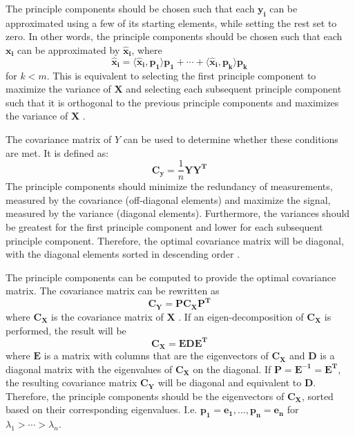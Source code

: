\documentclass[conference]{IEEEtran}
\begin{document}
    	The principle components should be chosen such that each $\mathbf{y_i}$ can be approximated using a few of its starting elements, while setting the rest set to zero. In other words, the principle components should be chosen such that each $\mathbf{x_i}$ can be approximated by $\mathbf{\hat{x}_i}$, where 
    	\begin{equation}
 		\mathbf{\hat{x}_i} = \langle \mathbf{\hat{x}_i}, \mathbf{p_1} \rangle \mathbf{p_1} + \cdots + \langle \mathbf{\hat{x}_i}, \mathbf{p_k} \rangle \mathbf{p_k}
 	\end{equation}   	
    	for $k < m$. This is equivalent to selecting the first principle component to maximize the variance of $\mathbf{X}$ and selecting each subsequent principle component such that it is orthogonal to the previous principle components and maximizes the variance of $\mathbf{X}$ \cite{shlens_2014_tutorial}.
    	
    	The covariance matrix of $Y$ can be used to determine whether these conditions are met. It is defined as:
	\begin{equation}
		\mathbf{C_y} = \frac{1}{n}{\mathbf{YY^T}}
	\end{equation} 
	The principle components should minimize the redundancy of measurements, measured by the covariance (off-diagonal elements) and maximize the signal, measured by the variance (diagonal elements). Furthermore, the variances should be greatest for the first principle component and lower for each subsequent principle component. Therefore, the optimal covariance matrix will be diagonal, with the diagonal elements sorted in descending order \cite{shlens_2014_tutorial}.
	
	The principle components can be computed to provide the optimal covariance matrix. The covariance matrix can be rewritten as
	\begin{equation}
		\mathbf{\mathbf{C_Y}} = {\mathbf{PC_XP^T}}
	\end{equation}
	where $\mathbf{C_X}$ is the covariance matrix of $\mathbf{X}$ \cite{shlens_2014_tutorial}. If an eigen-decomposition of $\mathbf{C_X}$ is performed, the result will be
	\begin{equation}
		\mathbf{C_X} = \mathbf{EDE^T}
	\end{equation}
	where $\mathbf{E}$ is a matrix with columns that are the eigenvectors of $\mathbf{C_X}$ and $\mathbf{D}$ is a diagonal matrix with the eigenvalues of $\mathbf{C_X}$ on the diagonal. If $\mathbf{P} = \mathbf{E^{-1}} = \mathbf{E^T}$, the resulting covariance matrix $\mathbf{C_Y}$ will be diagonal and equivalent to $\mathbf{D}$. Therefore, the principle components should be the eigenvectors of $\mathbf{C_X}$, sorted based on their corresponding eigenvalues. I.e. \newline $\mathbf{p_1} = \mathbf{e_1}, ..., \mathbf{p_n} = \mathbf{e_n}$ for $\lambda_1 > \cdots > \lambda_n$. 
	
\end{document}
